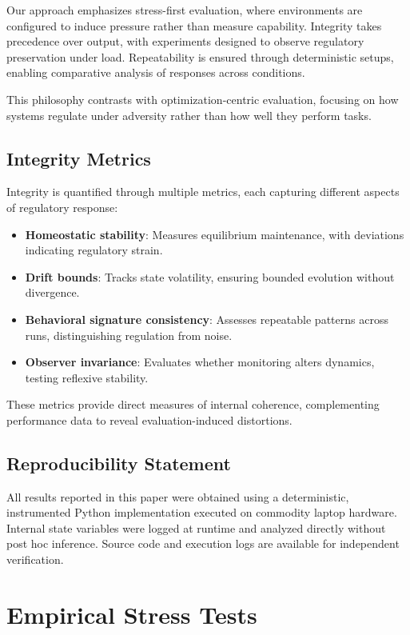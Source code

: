 \documentclass[12pt,a4paper]{report}
\begin{document}
Our approach emphasizes stress-first evaluation, where environments are configured to induce pressure rather than measure capability. Integrity takes precedence over output, with experiments designed to observe regulatory preservation under load. Repeatability is ensured through deterministic setups, enabling comparative analysis of responses across conditions.

This philosophy contrasts with optimization-centric evaluation, focusing on how systems regulate under adversity rather than how well they perform tasks.

\subsection{Integrity Metrics}

Integrity is quantified through multiple metrics, each capturing different aspects of regulatory response:

\begin{itemize}
\item \textbf{Homeostatic stability}: Measures equilibrium maintenance, with deviations indicating regulatory strain.
\item \textbf{Drift bounds}: Tracks state volatility, ensuring bounded evolution without divergence.
\item \textbf{Behavioral signature consistency}: Assesses repeatable patterns across runs, distinguishing regulation from noise.
\item \textbf{Observer invariance}: Evaluates whether monitoring alters dynamics, testing reflexive stability.
\end{itemize}

These metrics provide direct measures of internal coherence, complementing performance data to reveal evaluation-induced distortions.

\subsection{Reproducibility Statement}

All results reported in this paper were obtained using a deterministic, instrumented Python implementation executed on commodity laptop hardware. Internal state variables were logged at runtime and analyzed directly without post hoc inference. Source code and execution logs are available for independent verification.

\section{Empirical Stress Tests}
\end{document}
